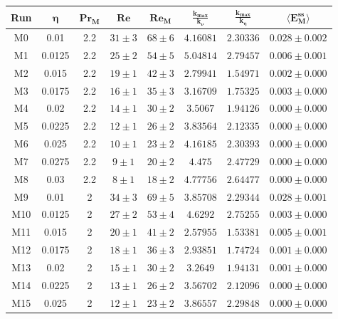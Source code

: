 \documentclass[12pt,a4paper]{report}
\begin{document}
\begin{center}
\begin{longtable}{||c|c|c|c|c|c|c|c||}
\hline
\textbf{Run} & $ \bm{\eta} $ & $ \bm{ Pr_M} $ & $ \bm{ Re} $ & $ \bm{ Re_M} $ & $ \bm{ \frac{k_{max}}{k_\nu}} $ & $ \bm{ \frac{k_{max}}{k_\eta}} $ & $ \bm{ \langle E_M^{ss}} \rangle $ \\ \hline
M0 & 0.01 & 2.2 & $ 31 \pm 3 $ & $ 68 \pm 6 $ & $ 4.16081 $ & $ 2.30336 $ & $ 0.028 \pm 0.002 $ \\ \hline
M1 & 0.0125 & 2.2 & $ 25 \pm 2 $ & $ 54 \pm 5 $ & $ 5.04814 $ & $ 2.79457 $ & $ 0.006 \pm 0.001 $ \\ \hline
M2 & 0.015 & 2.2 & $ 19 \pm 1 $ & $ 42 \pm 3 $ & $ 2.79941 $ & $ 1.54971 $ & $ 0.002 \pm 0.000 $ \\ \hline
M3 & 0.0175 & 2.2 & $ 16 \pm 1 $ & $ 35 \pm 3 $ & $ 3.16709 $ & $ 1.75325 $ & $ 0.003 \pm 0.000 $ \\ \hline
M4 & 0.02 & 2.2 & $ 14 \pm 1 $ & $ 30 \pm 2 $ & $ 3.5067 $ & $ 1.94126 $ & $ 0.000 \pm 0.000 $ \\ \hline
M5 & 0.0225 & 2.2 & $ 12 \pm 1 $ & $ 26 \pm 2 $ & $ 3.83564 $ & $ 2.12335 $ & $ 0.000 \pm 0.000 $ \\ \hline
M6 & 0.025 & 2.2 & $ 10 \pm 1 $ & $ 23 \pm 2 $ & $ 4.16185 $ & $ 2.30393 $ & $ 0.000 \pm 0.000 $ \\ \hline
M7 & 0.0275 & 2.2 & $ 9 \pm 1 $ & $ 20 \pm 2 $ & $ 4.475 $ & $ 2.47729 $ & $ 0.000 \pm 0.000 $ \\ \hline
M8 & 0.03 & 2.2 & $ 8 \pm 1 $ & $ 18 \pm 2 $ & $ 4.77756 $ & $ 2.64477 $ & $ 0.000 \pm 0.000 $ \\ \hline
M9 & 0.01 & 2 & $ 34 \pm 3 $ & $ 69 \pm 5 $ & $ 3.85708 $ & $ 2.29344 $ & $ 0.028 \pm 0.001 $ \\ \hline
M10 & 0.0125 & 2 & $ 27 \pm 2 $ & $ 53 \pm 4 $ & $ 4.6292 $ & $ 2.75255 $ & $ 0.003 \pm 0.000 $ \\ \hline
M11 & 0.015 & 2 & $ 20 \pm 1 $ & $ 41 \pm 2 $ & $ 2.57955 $ & $ 1.53381 $ & $ 0.005 \pm 0.001 $ \\ \hline
M12 & 0.0175 & 2 & $ 18 \pm 1 $ & $ 36 \pm 3 $ & $ 2.93851 $ & $ 1.74724 $ & $ 0.001 \pm 0.000 $ \\ \hline
M13 & 0.02 & 2 & $ 15 \pm 1 $ & $ 30 \pm 2 $ & $ 3.2649 $ & $ 1.94131 $ & $ 0.001 \pm 0.000 $ \\ \hline
M14 & 0.0225 & 2 & $ 13 \pm 1 $ & $ 26 \pm 2 $ & $ 3.56702 $ & $ 2.12096 $ & $ 0.000 \pm 0.000 $ \\ \hline
M15 & 0.025 & 2 & $ 12 \pm 1 $ & $ 23 \pm 2 $ & $ 3.86557 $ & $ 2.29848 $ & $ 0.000 \pm 0.000 $ \\ \hline

\end{longtable}
\end{center}
\end{document}

